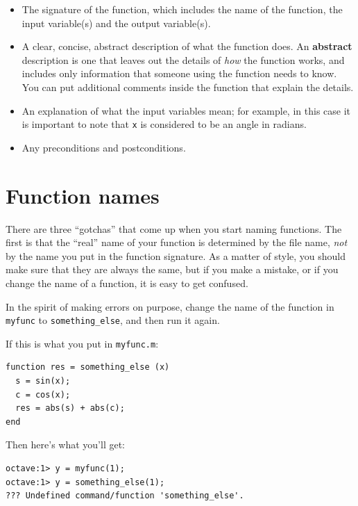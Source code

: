 \documentclass{book}
\begin{document}
\begin{itemize}

\item The signature of the function, which includes the name
of the function, the input variable(s) and the output variable(s).

\item A clear, concise, abstract description of what the function does.
An {\bf abstract} description is one that leaves out the
details of {\em how} the function works, and includes only information
that someone using the function needs to know. You can put additional
comments inside the function that explain the details.

\item An explanation of what the input variables mean; for example,
in this case it is important to note that {\tt x} is considered
to be an angle in radians.

\item Any preconditions and postconditions.

\end{itemize}



\section{Function names}

There are three ``gotchas'' that come up when you start naming
functions. The first is that the ``real'' name of your function
is determined by the file name, {\em not} by the name
you put in the function signature. As a matter of style, you
should make sure that they are always the same, but if you
make a mistake, or if you change the name of a function, it is
easy to get confused.

In the spirit of making errors on purpose, change the name of
the function in {\tt myfunc} to {\tt something\_else}, and
then run it again.

If this is what you put in {\tt myfunc.m}:

\begin{verbatim}
function res = something_else (x)
  s = sin(x);
  c = cos(x);
  res = abs(s) + abs(c);
end
\end{verbatim}

Then here's what you'll get:

\begin{verbatim}
octave:1> y = myfunc(1);
octave:1> y = something_else(1);
??? Undefined command/function 'something_else'.
\end{verbatim}
\end{document}

